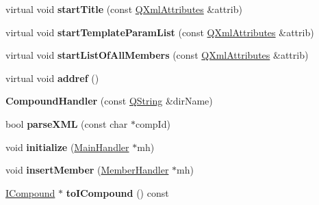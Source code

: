 \begin{DoxyCompactItemize}
\item 
\hypertarget{class_compound_handler_a542aae01d1b2fae60d3c4dd0b77f6669}{virtual void {\bfseries start\-Title} (const \hyperlink{class_q_xml_attributes}{Q\-Xml\-Attributes} \&attrib)}\label{class_compound_handler_a542aae01d1b2fae60d3c4dd0b77f6669}

\item 
\hypertarget{class_compound_handler_a2de4ded6787264c3be9d44c1b532114b}{virtual void {\bfseries start\-Template\-Param\-List} (const \hyperlink{class_q_xml_attributes}{Q\-Xml\-Attributes} \&attrib)}\label{class_compound_handler_a2de4ded6787264c3be9d44c1b532114b}

\item 
\hypertarget{class_compound_handler_a2607d3987dd3c5d47bd7ecb8d1e1adc0}{virtual void {\bfseries start\-List\-Of\-All\-Members} (const \hyperlink{class_q_xml_attributes}{Q\-Xml\-Attributes} \&attrib)}\label{class_compound_handler_a2607d3987dd3c5d47bd7ecb8d1e1adc0}

\item 
\hypertarget{class_compound_handler_a4c00c1eb3364b61f9dc7e8fd45113569}{virtual void {\bfseries addref} ()}\label{class_compound_handler_a4c00c1eb3364b61f9dc7e8fd45113569}

\item 
\hypertarget{class_compound_handler_a11ca94979b706a7feef09c5c578384ec}{{\bfseries Compound\-Handler} (const \hyperlink{class_q_string}{Q\-String} \&dir\-Name)}\label{class_compound_handler_a11ca94979b706a7feef09c5c578384ec}

\item 
\hypertarget{class_compound_handler_a5dadaa976eadd3b15085a88620511050}{bool {\bfseries parse\-X\-M\-L} (const char $\ast$comp\-Id)}\label{class_compound_handler_a5dadaa976eadd3b15085a88620511050}

\item 
\hypertarget{class_compound_handler_a477d68af87dc751b2c70936c91980873}{void {\bfseries initialize} (\hyperlink{class_main_handler}{Main\-Handler} $\ast$mh)}\label{class_compound_handler_a477d68af87dc751b2c70936c91980873}

\item 
\hypertarget{class_compound_handler_a2ed25907a4ed0d00cabb8428d9713323}{void {\bfseries insert\-Member} (\hyperlink{class_member_handler}{Member\-Handler} $\ast$mh)}\label{class_compound_handler_a2ed25907a4ed0d00cabb8428d9713323}

\item 
\hypertarget{class_compound_handler_a7336fe63ce7b7a1e6d0c3c70b2833f2a}{\hyperlink{class_i_compound}{I\-Compound} $\ast$ {\bfseries to\-I\-Compound} () const }\label{class_compound_handler_a7336fe63ce7b7a1e6d0c3c70b2833f2a}


\end{DoxyCompactItemize}
